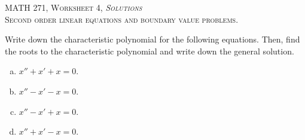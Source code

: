 \documentclass[12pt]{article} %
\begin{document}
\begin{center}
   \textsc{\large MATH 271, Worksheet 4, \emph{Solutions}}\\
   \textsc{Second order linear equations and boundary value problems.}
\end{center}
\vspace{.5cm}

\begin{problem}
Write down the characteristic polynomial for the following equations.  Then, find the roots to the characteristic polynomial and write down the general solution.
\begin{enumerate}[(a)]
    \item $x''+x'+x=0$.
    \item $x''-x'-x=0$.
    \item $x''-x'+x=0$.
    \item $x''+x'-x=0$.
\end{enumerate}
\end{problem}
\end{document}
